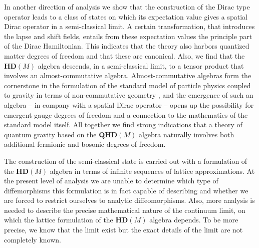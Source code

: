 \documentclass[12pt]{article}
\begin{document}
In another direction of analysis we show that the construction of the Dirac type operator leads to a class of states on which its expectation value gives a spatial Dirac operator in a semi-classical limit. A certain transformation, that introduces the lapse and shift fields, entails from these expectation values the principle part of the Dirac Hamiltonian. This indicates that the theory also harbors quantized matter degrees of freedom and that these are canonical.
Also, we find that the $\mathbf{HD}(M)$ algebra descends, in a semi-classical limit, to a tensor product that involves an almost-commutative algebra. Almost-commutative algebras form the cornerstone in the formulation of the standard model of particle physics coupled to gravity in terms of non-commutative geometry \cite{Connes:1996gi,Chamseddine:2007hz}, and the emergence of such an algebra -- in company with a spatial Dirac operator -- opens up the possibility for emergent gauge degrees of freedom and a connection to the mathematics of the standard model itself. All together we find strong indications that a theory of quantum gravity based on the $\mathbf{QHD}(M)$ algebra naturally involves both additional fermionic and bosonic degrees of freedom.









The construction of the semi-classical state is carried out with a formulation of the $\mathbf{HD}(M)$ algebra in terms of infinite sequences of lattice approximations.  At the present level of analysis we are unable to determine which type of diffemorphisms this formulation is in fact capable of describing and whether we are forced to restrict ourselves to analytic diffeomorphisms. Also, more analysis is needed to describe the precise mathematical nature of the continuum limit, on which the lattice formulation of the $\mathbf{HD}(M)$ algebra depends. To be more precise, we know that the limit exist but the exact details of the limit are not completely known.
\end{document}
